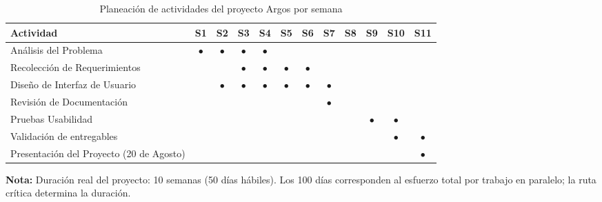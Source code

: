 \begin{table}[htbp]
  \centering
  \caption{Planeación de actividades del proyecto Argos por semana}
  \begin{tabular}{lccccccccccc}
    \toprule
    \rowcolor{gray!30}
    \textbf{Actividad} & \textbf{S1} & \textbf{S2} & \textbf{S3} & \textbf{S4} & \textbf{S5} & \textbf{S6} & \textbf{S7} & \textbf{S8} & \textbf{S9} & \textbf{S10} & \textbf{S11} \\
    \midrule
    Análisis del Problema & \cellcolor{green!30}$\bullet$ & \cellcolor{green!30}$\bullet$ & \cellcolor{green!30}$\bullet$ & \cellcolor{green!30}$\bullet$ &  &  &  &  &  &  &  \\
    Recolección de Requerimientos &  &  & \cellcolor{blue!20}$\bullet$ & \cellcolor{blue!20}$\bullet$ & \cellcolor{blue!20}$\bullet$  & \cellcolor{blue!20}$\bullet$  &  &  &  &  &  \\
    Diseño de Interfaz de Usuario &  & \cellcolor{orange!30}$\bullet$ & \cellcolor{orange!30}$\bullet$ & \cellcolor{orange!30}$\bullet$ & \cellcolor{orange!30}$\bullet$ & \cellcolor{orange!30}$\bullet$ & \cellcolor{orange!30}$\bullet$ &  &  &  &  \\
    Revisión de Documentación &  &  &  &  &  &  & \cellcolor{purple!20}$\bullet$ &  &  &  &  \\
    Pruebas Usabilidad &  &  &  &  &  &  &  &  & \cellcolor{cyan!20}$\bullet$ & \cellcolor{cyan!20}$\bullet$ &  \\
    Validación de entregables &  &  &  &  &  &  &  &  &  & \cellcolor{red!20}$\bullet$ & \cellcolor{red!20}$\bullet$ \\
    Presentación del Proyecto (20 de Agosto) &  &  &  &  &  &  &  &  &  &  & \cellcolor{gray!60}$\bullet$ \\
    \bottomrule
  \end{tabular}
  \label{tab:planeacion_argos}
\end{table}
\vspace{0.7em}
\noindent\textbf{Nota:} Duración real del proyecto: 10 semanas (50 días hábiles). Los 100 días corresponden al esfuerzo total por trabajo en paralelo; la ruta crítica determina la duración.